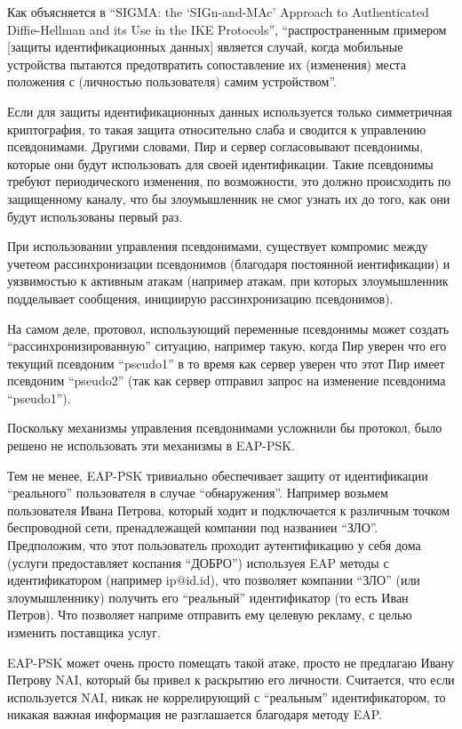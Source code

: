 Как объясняется в ``SIGMA: the `SIGn-and-MAc' Approach to Authenticated Diffie-Hellman and its Use in the IKE Protocols'', ``распространенным примером [защиты идентификационных данных] является случай, когда мобильные устройства пытаются предотвратить сопоставление их (изменения) места положения с (личностью пользователя) самим устройством''.

Если для защиты идентификационных данных используется только симметричная криптография, то такая защита относительно слаба и сводится к управлению псевдонимами. Другими словами, Пир и сервер согласовывают псевдонимы, которые они будут использовать для своей идентификации. Такие псевдонимы требуют периодического изменения, по возможности, это должно происходить по защищенному каналу, что бы злоумышленник не смог узнать их до того, как они будут использованы первый раз.

При использовании управления псевдонимами, существует компромис между учетеом рассинхронизации псевдонимов (благодаря постоянной иентификации) и уязвимостью к активным атакам (например атакам, при которых злоумышленник подделывает сообщения, инициирую рассинхронизацию псевдонимов).

На самом деле, протовол, использующий переменные псевдонимы может создать ``рассинхронизированную'' ситуацию, например такую, когда Пир уверен что его текущий псевдоним ``pseudo1'' в то время как сервер уверен что этот Пир имеет псевдоним ``pseudo2'' (так как сервер отправил запрос на изменение псевдонима ``pseudo1'').

Поскольку механизмы управления псевдонимами усложнили бы протокол, было решено не использовать эти механизмы в EAP-PSK.

Тем не менее, EAP-PSK тривиально обеспечивает защиту от идентификации ``реального'' пользователя в случае ``обнаружения''. Например возьмем пользователя Ивана Петрова, который ходит и подключается к различным точком беспроводной сети, пренадлежащей компании под названиеи ``ЗЛО''. Предположим, что этот пользователь проходит аутентификацию у себя дома (услуги предоставляет коспания ``ДОБРО'') используея EAP методы с идентификатором (например ip@id.id), что позволяет компании ``ЗЛО'' (или злоумышленнику) получить его ``реальный'' идентификатор (то есть Иван Петров). Что позволяет наприме отправить ему целевую рекламу, с целью изменить поставщика услуг.

EAP-PSK может очень просто помещать такой атаке, просто не предлагаю Ивану Петрову NAI, который бы привел к раскрытию его личности. Считается, что если используется NAI, никак не коррелирующий с ``реальным'' идентификатором, то никакая важная информация не разглашается благодаря методу EAP.

